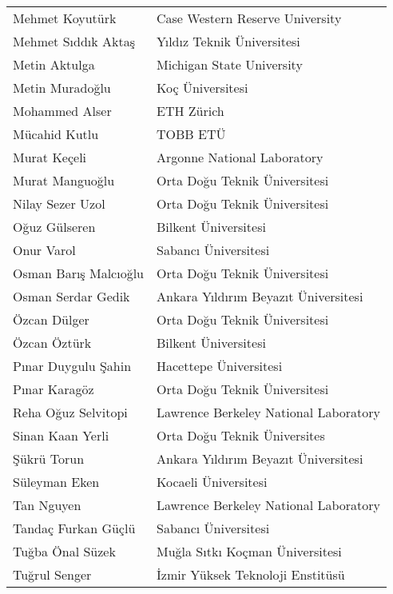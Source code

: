 \begin{center}
\begin{tabular}{ll}
Mehmet Koyutürk & Case Western Reserve University \\
Mehmet Sıddık Aktaş & Yıldız Teknik Üniversitesi \\
Metin Aktulga & Michigan State University \\
Metin Muradoğlu & Koç Üniversitesi \\
Mohammed Alser & ETH Zürich \\
Mücahid Kutlu & TOBB ETÜ \\
Murat Keçeli & Argonne National Laboratory \\
Murat Manguoğlu & Orta Doğu Teknik Üniversitesi \\
Nilay Sezer Uzol & Orta Doğu Teknik Üniversitesi \\
Oğuz Gülseren & Bilkent Üniversitesi \\
Onur Varol & Sabancı Üniversitesi \\
Osman Barış Malcıoğlu & Orta Doğu Teknik Üniversitesi \\
Osman Serdar Gedik & Ankara Yıldırım Beyazıt Üniversitesi \\
Özcan Dülger & Orta Doğu Teknik Üniversitesi \\
Özcan Öztürk & Bilkent Üniversitesi \\
Pınar Duygulu Şahin & Hacettepe Üniversitesi \\
Pınar Karagöz & Orta Doğu Teknik Üniversitesi \\
Reha Oğuz Selvitopi & Lawrence Berkeley National Laboratory \\
Sinan Kaan Yerli & Orta Doğu Teknik Üniversites \\
Şükrü Torun & Ankara Yıldırım Beyazıt Üniversitesi \\
Süleyman Eken & Kocaeli Üniversitesi \\
Tan Nguyen & Lawrence Berkeley National Laboratory \\
Tandaç Furkan Güçlü & Sabancı Üniversitesi \\
Tuğba Önal Süzek & Muğla Sıtkı Koçman Üniversitesi \\
Tuğrul Senger & İzmir Yüksek Teknoloji Enstitüsü \\
\end{tabular}
\end{center}


